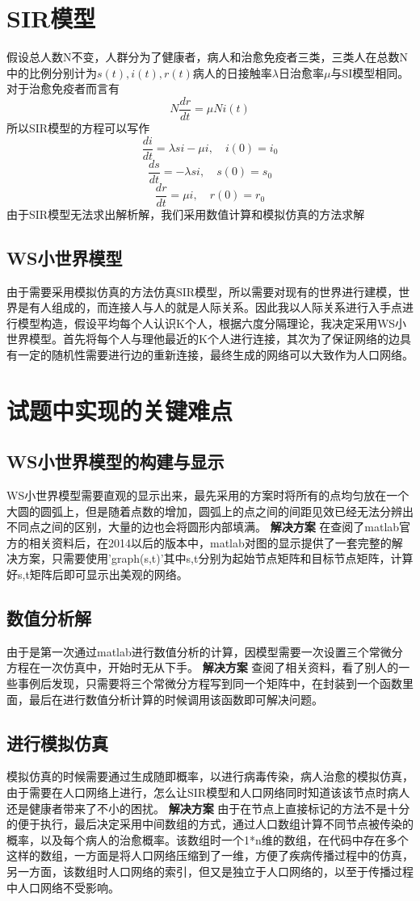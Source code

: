 \documentclass[supercite]{HustGraduPaper}
\begin{document}
	\section{SIR模型}
	假设总人数N不变，人群分为了健康者，病人和治愈免疫者三类，三类人在总数N中的比例分别计为$s(t),i(t),r(t)$病人的日接触率$\lambda$日治愈率$\mu$与SI模型相同。
	对于治愈免疫者而言有$$N\frac{dr}{dt}=\mu N i(t)$$
	所以SIR模型的方程可以写作
	$$\frac{di}{dt}=\lambda si-\mu i, \quad i(0)=i_0$$
	$$\frac{ds}{dt}=-\lambda si, \quad s(0)=s_0$$
	$$\frac{dr}{dt}=\mu i, \quad r(0)=r_0$$
	由于SIR模型无法求出解析解，我们采用数值计算和模拟仿真的方法求解

	\subsection{WS小世界模型}
	由于需要采用模拟仿真的方法仿真SIR模型，所以需要对现有的世界进行建模，世界是有人组成的，而连接人与人的就是人际关系。因此我以人际关系进行入手点进行模型构造，假设平均每个人认识K个人，根据六度分隔理论，我决定采用WS小世界模型。首先将每个人与理他最近的K个人进行连接，其次为了保证网络的边具有一定的随机性需要进行边的重新连接，最终生成的网络可以大致作为人口网络。
	
	\section{试题中实现的关键难点}
	\subsection{WS小世界模型的构建与显示}
	WS小世界模型需要直观的显示出来，最先采用的方案时将所有的点均匀放在一个大圆的圆弧上，但是随着点数的增加，圆弧上的点之间的间距见效已经无法分辨出不同点之间的区别，大量的边也会将圆形内部填满。
	\textbf{解决方案}
	在查阅了matlab官方的相关资料后，在2014以后的版本中，matlab对图的显示提供了一套完整的解决方案，只需要使用'graph(s,t)'其中s,t分别为起始节点矩阵和目标节点矩阵，计算好s,t矩阵后即可显示出美观的网络。
	
	\subsection{数值分析解}
	由于是第一次通过matlab进行数值分析的计算，因模型需要一次设置三个常微分方程在一次仿真中，开始时无从下手。
	\textbf{解决方案}
	查阅了相关资料，看了别人的一些事例后发现，只需要将三个常微分方程写到同一个矩阵中，在封装到一个函数里面，最后在进行数值分析计算的时候调用该函数即可解决问题。
	

	\subsection{进行模拟仿真}
	模拟仿真的时候需要通过生成随即概率，以进行病毒传染，病人治愈的模拟仿真，由于需要在人口网络上进行，怎么让SIR模型和人口网络同时知道该该节点时病人还是健康者带来了不小的困扰。
	\textbf{解决方案}
	由于在节点上直接标记的方法不是十分的便于执行，最后决定采用中间数组的方式，通过人口数组计算不同节点被传染的概率，以及每个病人的治愈概率。该数组时一个1*n维的数组，在代码中存在多个这样的数组，一方面是将人口网络压缩到了一维，方便了疾病传播过程中的仿真，另一方面，该数组时人口网络的索引，但又是独立于人口网络的，以至于传播过程中人口网络不受影响。
\end{document}
